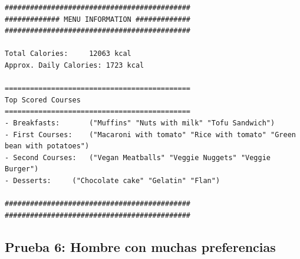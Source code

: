 \documentclass[11]{article}
\begin{document}
\begin{lstlisting}[frame=single]
############################################
############# MENU INFORMATION #############
############################################

Total Calories:		12063 kcal
Approx. Daily Calories:	1723 kcal

============================================
Top Scored Courses
============================================
- Breakfasts:		("Muffins" "Nuts with milk" "Tofu Sandwich")
- First Courses:	("Macaroni with tomato" "Rice with tomato" "Green bean with potatoes")
- Second Courses:	("Vegan Meatballs" "Veggie Nuggets" "Veggie Burger")
- Desserts:		("Chocolate cake" "Gelatin" "Flan")

############################################
############################################
\end{lstlisting}

\subsection{Prueba 6: Hombre con muchas preferencias}
\end{document}

